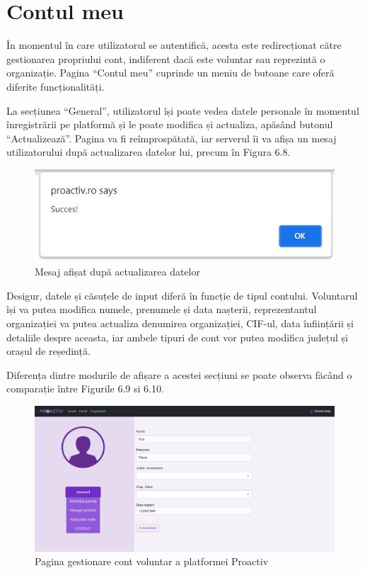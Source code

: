 \documentclass[12pt,a4paper]{report}
\begin{document}
\newpage
\section{Contul meu}
\par
În momentul în care utilizatorul se autentifică, acesta este redirecționat către gestionarea propriului cont, indiferent dacă este voluntar sau reprezintă o organizație. Pagina “Contul meu” cuprinde un meniu de butoane care oferă diferite funcționalități. 
\\\par
La secțiunea “General”, utilizatorul își poate vedea datele personale în momentul înregistrării pe platformă și le poate modifica și actualiza, apăsând butonul “Actualizează”. Pagina va fi reîmprospătată, iar serverul îi va afișa un mesaj utilizatorului după actualizarea datelor lui, precum în Figura 6.8.
\\
\begin{figure}[H]
\centering
  \includegraphics[width=0.5\linewidth]{./imagini/succes.jpg}
  \caption{Mesaj afișat după actualizarea datelor}
\end{figure}
\par
Desigur, datele și căsuțele de input diferă în funcție de tipul contului. Voluntarul își va putea modifica numele, prenumele și data nașterii, reprezentantul organizației va putea actualiza denumirea organizației, CIF-ul, data înființării și detaliile despre aceasta, iar ambele tipuri de cont vor putea modifica județul și orașul de reședință.
\\\par
Diferența dintre modurile de afișare a acestei secțiuni se poate observa făcând o comparație între Figurile 6.9 si 6.10.
\\
\begin{figure}[H]
\centering
  \includegraphics[width=1\linewidth]{./imagini/cont1.jpg}
  \caption{Pagina gestionare cont voluntar a platformei Proactiv}
\end{figure}
\end{document}
